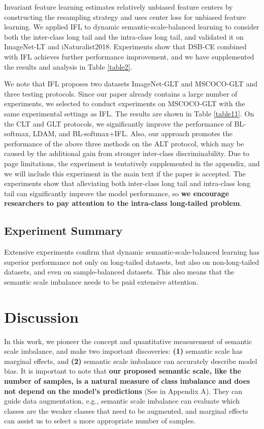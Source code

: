 \documentclass[10pt]{article} %
\begin{document}
Invariant feature learning estimates relatively unbiased feature centers by constructing the resampling strategy and uses center loss for unbiased feature learning. We applied IFL to dynamic semantic-scale-balanced learning to consider both the inter-class long tail and the intra-class long tail, and validated it on ImageNet-LT and iNaturalist2018. Experiments show that DSB-CE combined with IFL achieves further performance improvement, and we have supplemented the results and analysis in Table \ref{table2}.

We note that IFL proposes two datasets ImageNet-GLT and MSCOCO-GLT and three testing protocols. Since our paper already contains a large number of experiments, we selected to conduct experiments on MSCOCO-GLT with the same experimental settings as IFL. The results are shown in Table \ref{table11}. On the CLT and GLT protocols, we significantly improve the performance of BL-softmax, LDAM, and BL-softmax+IFL. Also, our approach promotes the performance of the above three methods on the ALT protocol, which may be caused by the additional gain from stronger inter-class discriminability. Due to page limitations, the experiment is tentatively supplemented in the appendix, and we will include this experiment in the main text if the paper is accepted. The experiments show that alleviating both inter-class long tail and intra-class long tail can significantly improve the model performance, so \textbf{we encourage researchers to pay attention to the intra-class long-tailed problem}.


\subsection{Experiment Summary}

Extensive experiments confirm that dynamic semantic-scale-balanced learning has superior performance not only on long-tailed datasets, but also on non-long-tailed datasets, and even on sample-balanced datasets. This also means that the semantic scale imbalance needs to be paid extensive attention.


\iffalse
\section{Discussion\label{discussion}}
In this work, we pioneer the concept and quantitative measurement of semantic scale imbalance, and make two important discoveries: \textbf{(1)} semantic scale has marginal effects, and \textbf{(2)} semantic scale imbalance can accurately describe model bias. It is important to note that \textbf{our proposed semantic scale, like the number of samples, is a natural measure of class imbalance and does not depend on the model's predictions} (See  in Appendix A). They can guide data augmentation, e.g., semantic scale imbalance can evaluate which classes are the weaker classes that need to be augmented, and marginal effects can assist us to select a more appropriate number of samples.
\end{document}
